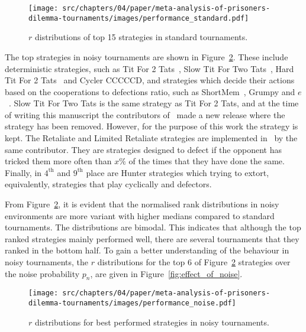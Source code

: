 \begin{figure}[!htbp]
    \centering
    \texttt{[image: src/chapters/04/paper/meta-analysis-of-prisoners-dilemma-tournaments/images/performance\_standard.pdf]}
    \caption{$r$ distributions of top 15 strategies in standard tournaments.}\label{fig:std_results}
\end{figure}

The top strategies in noisy tournaments are shown in Figure~\ref{fig:noisy_results}. These include deterministic strategies, such
as Tit For 2 Tats~\cite{Axelrod1980b}, Slow Tit For Two Tats~\cite{axelrodproject}, Hard Tit For 2 Tats~\cite{Stewart2012}
and Cycler CCCCCD, and strategies which decide their actions based on the
cooperations to defections ratio, such as ShortMem~\cite{Andre2013}, Grumpy
and $e$~\cite{axelrodproject}. Slow Tit For Two Tats is the same strategy as 
Tit For 2 Tats, and at the time of writing this manuscript the
contributors of~\cite{axelrodproject} made a new release where the strategy
has been removed. However, for the purpose of this work the strategy is kept.
The Retaliate and
Limited Retaliate strategies are implemented in~\cite{axelrodproject} by the
same contributor. They are strategies designed to defect if the opponent has
tricked them more often than \(x\%\) of the times that they have
done the same. Finally, in $4^{\text{th}}$ and $9^{\text{th}}$ place are Hunter
strategies which trying to extort, equivalently, strategies that play cyclically
and defectors.

From Figure~\ref{fig:noisy_results}, it is evident that the normalised rank
distributions in noisy environments are more variant with higher medians
compared to standard tournaments. The distributions are bimodal. This indicates
that although the top ranked strategies mainly performed well, there are several
tournaments that they ranked in the bottom half. To gain a better understanding
of the behaviour in noisy tournaments, the \(r\) distributions for the top 6
of Figure~\ref{fig:noisy_results} strategies over the noise probability \(p_n\),
are given in Figure~\ref{fig:effect_of_noise}.

\begin{figure}[!htbp]
    \centering
    \texttt{[image: src/chapters/04/paper/meta-analysis-of-prisoners-dilemma-tournaments/images/performance\_noise.pdf]}
    \caption{\(r\) distributions for best performed strategies in noisy tournaments.}
    \label{fig:noisy_results}
\end{figure}

